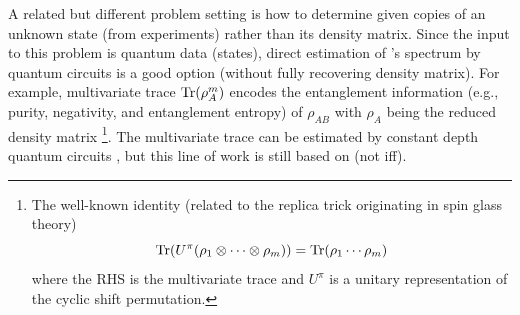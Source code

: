 \documentclass[
aps,
pra,
twocolumn,
floatfix,
]{revtex4-2}
\theoremstyle{plain}
\theoremstyle{definition}
\newtheorem{definition}{Definition}
\newcommand{\dm}{\rho}
\newcommand{\hamiltonian}{\hat{H}}
\newcommand{\U}{U}
\begin{document}
A related but different problem setting is how to determine  given copies of an unknown state (from experiments) rather than its density matrix.
Since the input to this problem is quantum data (states), direct estimation of 's spectrum by quantum circuits is a good option (without fully recovering density matrix).
For example, multivariate trace $\Tr(\dm_A^m)$ encodes the entanglement information (e.g., purity, negativity, and entanglement entropy) of $\dm_{AB}$ with $\dm_A$ being the  reduced density matrix
 \cite{ekertDirectEstimationsLinear2002} \cite{horodeckiDirectDetectionQuantum2002}
\footnote{
	The well-known identity (related to the replica trick originating in spin glass theory)
	\begin{equation}
		\Tr(\U^{\pi} (\dm_1 \otimes \cdots \otimes \dm_m) ) = 
		\Tr(\dm_1\cdots \dm_m)
	\end{equation}
	where the RHS is the multivariate trace and $\U^{\pi}$ is a unitary representation of the cyclic shift permutation.
}.
The multivariate trace can be estimated by constant depth quantum circuits \cite{johriEntanglementSpectroscopyQuantum2017}  \cite{quekMultivariateTraceEstimation2022}, but this line of work is still based on  (not iff).
\end{document}
